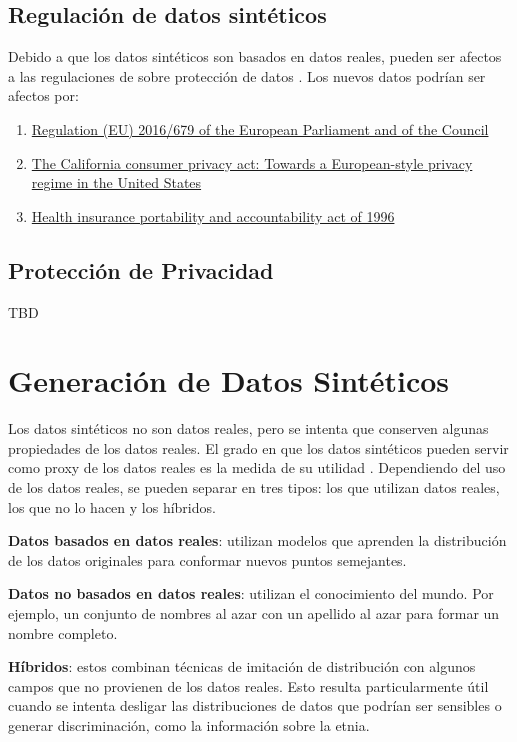 \subsection{Regulación de datos sintéticos}
Debido a que los datos sintéticos son basados en datos reales, pueden ser afectos a las regulaciones de sobre protección de datos \cite{bruce_practical_2020}. Los nuevos datos podrían ser afectos por:
\begin{enumerate}
    \item \href{https://dvbi.ru/Portals/0/DOCUMENTS_SHARE/RISK_MANAGEMENT/EBA/GDPR_eng_rus.pdf}{Regulation (EU) 2016/679 of the European Parliament and of the Council} \cite{regulation_regulation_2016}
    \item \href{https://heinonline.org/HOL/LandingPage?handle=hein.journals/jtlp23&div=5&id=&page=}{The California consumer privacy act: Towards a European-style privacy regime in the United States} \cite{pardau_california_2018}
    \item \href{http://www.eolusinc.com/pdf/hipaa.pdf}{Health insurance portability and accountability act of 1996} \cite{act_health_1996}
\end{enumerate}

\subsection{Protección de Privacidad}
TBD

\section{Generación de Datos Sintéticos}

Los datos sintéticos no son datos reales, pero se intenta que conserven algunas propiedades de los datos reales. El grado en que los datos sintéticos pueden servir como proxy de los datos reales es la medida de su utilidad \cite{bruce_practical_2020}. Dependiendo del uso de los datos reales, se pueden separar en tres tipos: los que utilizan datos reales, los que no lo hacen y los híbridos.

\textbf{Datos basados en datos reales}: utilizan modelos que aprenden la distribución de los datos originales para conformar nuevos puntos semejantes.

\textbf{Datos no basados en datos reales}: utilizan el conocimiento del mundo. Por ejemplo, un conjunto de nombres al azar con un apellido al azar para formar un nombre completo.

\textbf{Híbridos}: estos combinan técnicas de imitación de distribución con algunos campos que no provienen de los datos reales. Esto resulta particularmente útil cuando se intenta desligar las distribuciones de datos que podrían ser sensibles o generar discriminación, como la información sobre la etnia.


